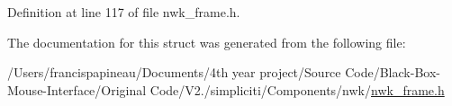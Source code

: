 \-Definition at line 117 of file nwk\-\_\-frame.\-h.



\-The documentation for this struct was generated from the following file\-:\begin{DoxyCompactItemize}
\item 
/\-Users/francispapineau/\-Documents/4th year project/\-Source Code/\-Black-\/\-Box-\/\-Mouse-\/\-Interface/\-Original Code/\-V2./simpliciti/\-Components/nwk/\hyperlink{nwk__frame_8h}{nwk\-\_\-frame.\-h}\end{DoxyCompactItemize}
